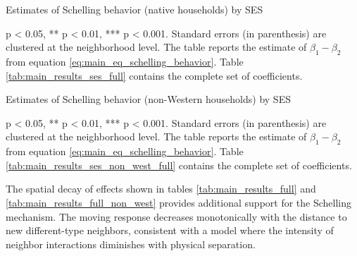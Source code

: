 \documentclass[../main.tex]{subfiles}
\begin{document}
\begin{landscape}
\begin{table}[H]
    \centering
    \caption{Estimates of Schelling behavior (native households) by SES}
    \label{tab:main_results_ses}
    \begin{adjustbox}{width = 0.65\linewidth, center}    
    \begin{threeparttable}
            
    \begin{tablenotes}[flushleft]
    \item \scriptsize * p < 0.05, ** p < 0.01, *** p < 0.001. Standard errors (in parenthesis) are clustered at the neighborhood level. The table reports the estimate of $\beta_1 - \beta_2$ from equation \ref{eq:main_eq_schelling_behavior}. Table \ref{tab:main_results_ses_full} contains the complete set of coefficients.
    \end{tablenotes}
    \end{threeparttable}
    \end{adjustbox}
\end{table}
\begin{table}[H]
    \centering
    \caption{Estimates of Schelling behavior (non-Western households) by SES}
    \label{tab:main_results_ses_non_west}
    \begin{adjustbox}{width = 0.65\linewidth, center}    
    \begin{threeparttable}
            
    \begin{tablenotes}[flushleft]
    \item \scriptsize * p < 0.05, ** p < 0.01, *** p < 0.001. Standard errors (in parenthesis) are clustered at the neighborhood level. The table reports the estimate of $\beta_1 - \beta_2$ from equation \ref{eq:main_eq_schelling_behavior}. Table \ref{tab:main_results_ses_non_west_full} contains the complete set of coefficients.
    \end{tablenotes}
    \end{threeparttable}
    \end{adjustbox}
\end{table}
\end{landscape}

The spatial decay of effects shown in tables \ref{tab:main_results_full} and \ref{tab:main_results_full_non_west} provides additional support for the Schelling mechanism. The moving response decreases monotonically with the distance to new different-type neighbors, consistent with a model where the intensity of neighbor interactions diminishes with physical separation.
\end{document}
